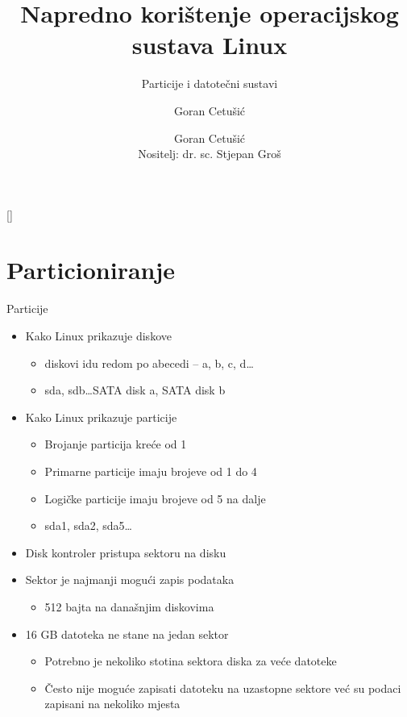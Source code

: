 \documentclass[croatian,t]{beamer} %
\title[NKOSL]{Napredno korištenje operacijskog sustava Linux}
\subtitle{Particije i datotečni sustavi}
\author{Goran Cetušić}
\author[Goran Cetušić]{Goran Cetušić\\{\small Nositelj: dr. sc. Stjepan Groš}}
\institute[FER]{Sveučilište u Zagrebu \\
				Fakultet elektrotehnike i računarstva}
\date{\todayiso}
\begin{document}
    {
    [] %
    \begin{frame}
        \maketitle
    \end{frame}
    }
    
    \begin{frame}
        \tableofcontents
    \end{frame}
    
    \section{Particioniranje}
    \begin{frame}{Particije}
    	\begin{itemize}
    		\item Kako Linux prikazuje diskove
    		\begin{itemize}
    			\item diskovi idu redom po abecedi – a, b, c, d\ldots
    			\item sda, sdb\ldots SATA disk a, SATA disk b
    		\end{itemize}
    		\item Kako Linux prikazuje particije
    		\begin{itemize}
    			\item Brojanje particija kreće od 1
    			\item Primarne particije imaju brojeve od 1 do 4
    			\item Logičke particije imaju brojeve od 5 na dalje
    			\item sda1, sda2, sda5\ldots
    		\end{itemize}
    		\item Disk kontroler pristupa sektoru na disku
    	 	\item Sektor je najmanji mogući zapis podataka
    	 	\begin{itemize}
    	 		\item 512 bajta na današnjim diskovima
    	 	\end{itemize} 
    	 	\item 16 GB datoteka ne stane na jedan sektor
    	 	\begin{itemize}
    	 		\item Potrebno je nekoliko stotina sektora diska za veće datoteke
    	 		\item Često nije moguće zapisati datoteku na uzastopne sektore već su podaci zapisani na nekoliko mjesta
    	 	\end{itemize}
    	\end{itemize}
	\end{frame}
	
\end{document}
